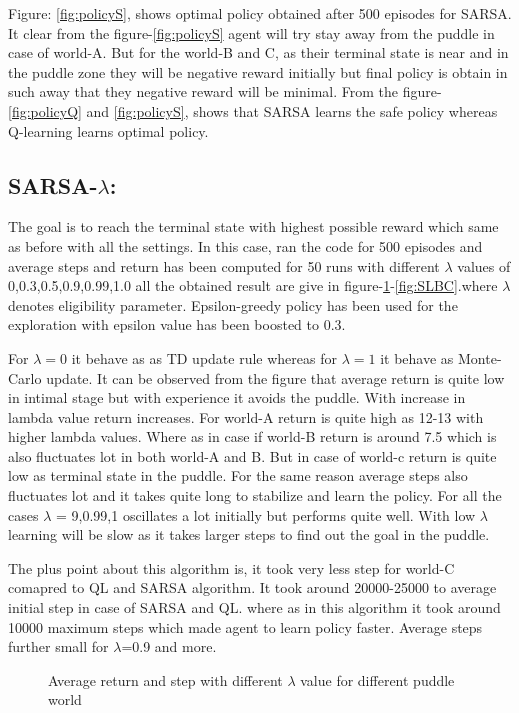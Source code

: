 \documentclass[preprint,12pt]{elsarticle}
\begin{document}
Figure: \ref{fig:policyS}, shows optimal policy obtained after 500 episodes for SARSA. It clear from the figure-\ref{fig:policyS} agent will try stay away from the puddle in case of world-A. But for the world-B and C, as their terminal state is near and in the puddle zone they will be negative reward initially but final policy is obtain in such away that they negative reward will be minimal. From the figure-\ref{fig:policyQ} and \ref{fig:policyS}, shows that SARSA learns the safe policy whereas Q-learning learns optimal policy.

\subsection{SARSA-$\lambda$:}
The goal is to reach the terminal state with highest possible reward which same as before with all the settings. In this case, ran the code for 500 episodes and average steps and return has been computed for 50 runs with different $\lambda$ values of {0,0.3,0.5,0.9,0.99,1.0} all the obtained result are give in figure-\ref{fig:SLA}-\ref{fig:SLBC}.where $\lambda$  denotes eligibility parameter. Epsilon-greedy policy has been used for the exploration with epsilon value has been boosted to 0.3. 

For $\lambda=0$ it behave as as TD update rule whereas for $\lambda=1$ it behave as Monte-Carlo update. It can be observed from the figure that average return is quite low in intimal stage but with experience it avoids the puddle. With increase in lambda value return increases. For world-A return is quite high as 12-13 with higher lambda values. Where as in case if world-B return is around 7.5 which is also fluctuates lot in both world-A and B. But in case of world-c return is quite low as terminal state in the puddle. For the same reason average steps also fluctuates lot and it takes quite long to stabilize and learn the policy. For all the cases $\lambda$ = {9,0.99,1} oscillates a lot initially but performs quite well. With low $\lambda$ learning will be slow as it takes larger steps to find out the goal in the puddle.

The plus point about this algorithm is, it took very less step for world-C comapred to QL and SARSA algorithm. It took around 20000-25000 to average initial step in case of SARSA and QL. where as in this algorithm it took around 10000 maximum steps which made agent to learn policy faster. Average steps further small for $\lambda$=0.9 and more.  

\begin{figure}[H]
	\centering  
	\caption{Average return and step with different $\lambda$ value for different puddle world }
	\label{fig:SLA}
\end{figure}
\end{document}

